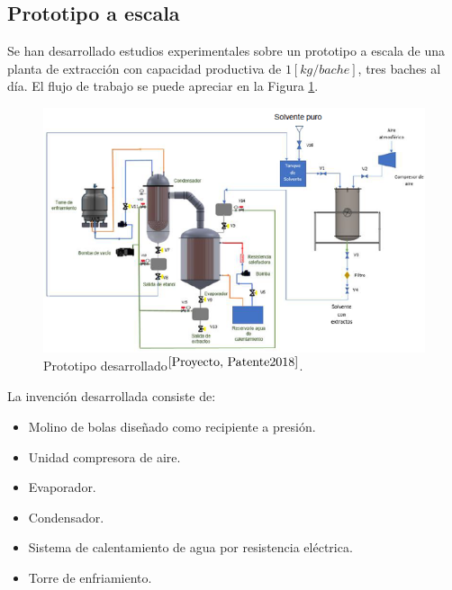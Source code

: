 \newpage

\subsection{Prototipo a escala}

\noindent
\justify

Se han desarrollado estudios experimentales sobre un prototipo a escala de una planta de extracci\'on con capacidad productiva de $1 [kg / bache]$, tres baches al d\'ia. El flujo de trabajo se puede apreciar en la Figura \ref{cadena}.

\begin{figure}[h!]
	\centering
	\includegraphics[width=1.1\textwidth]{Images/planta.PNG}
	\caption{Prototipo desarrollado$^{\cite{Proyecto, Patente2018}}$.}
	\label{cadena}
\end{figure}

La invenci\'on desarrollada consiste de:
\begin{itemize}
	\item Molino de bolas dise\~nado como recipiente a presi\'on.
	\item Unidad compresora de aire.
	\item Evaporador.
	\item Condensador.
	\item Sistema de calentamiento de agua por resistencia el\'ectrica.
	\item Torre de enfriamiento.
\end{itemize}


